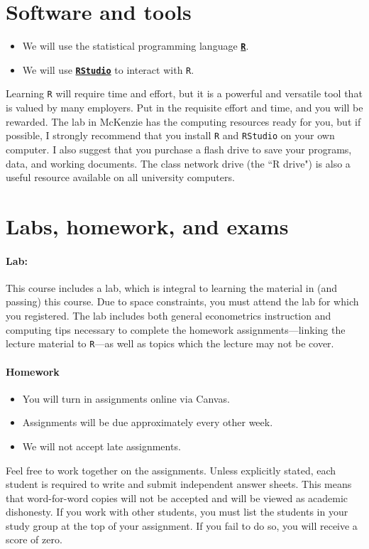 \documentclass[10pt]{article}
\begin{document}
\section*{Software and tools}

\begin{itemize}
  \item We will use the statistical programming language \href{https://www.r-project.org/}{\textbf{\texttt{R}}}.
  \item We will use \href{https://www.rstudio.com}{\textbf{\texttt{RStudio}}} to interact with \texttt{R}.
\end{itemize}
Learning \texttt{R} will require time and effort, but it is a powerful and versatile tool that is valued by many employers. Put in the requisite effort and time, and you will be rewarded. The lab in McKenzie has the computing resources ready for you, but if possible, I strongly recommend that you install \texttt{R} and \texttt{RStudio} on your own computer. I also suggest that you purchase a flash drive to save your programs, data, and working documents. The class network drive (the ``R drive") is also a useful resource available on all university computers.

\section*{Labs, homework, and exams}

\paragraph{Lab:} This course includes a lab, which is integral to learning the material in (and passing) this course. Due to space constraints, you must attend the lab for which you registered. The lab includes both general econometrics instruction and computing tips necessary to complete the homework assignments---linking the lecture material to \texttt{R}---as well as topics which the lecture may not be cover.

\paragraph{Homework}
\begin{itemize}
  \item You will turn in assignments online via Canvas.
  \item Assignments will be due approximately every other week.
  \item We will not accept late assignments.
\end{itemize}
Feel free to work together on the assignments. Unless explicitly stated, each student is required to write and submit independent answer sheets. This means that word-for-word copies will not be accepted and will be viewed as academic dishonesty. If you work with other students, you must list the students in your study group at the top of your assignment. If you fail to do so, you will receive a score of zero.
\end{document}

